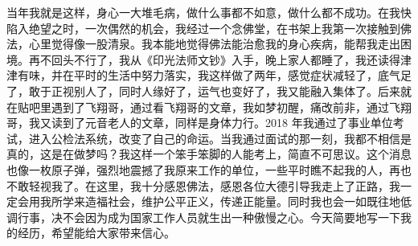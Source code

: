\begin{case}
    当年我就是这样，身心一大堆毛病，做什么事都不如意，做什么都不成功。在我快陷入绝望之时，一次偶然的机会，我经过一个念佛堂，在书架上我第一次接触到佛法，心里觉得像一股清泉。我本能地觉得佛法能治愈我的身心疾病，能帮我走出困境。再不回头不行了，我从《印光法师文钞》入手，晚上家人都睡了，我还读得津津有味，并在平时的生活中努力落实，我这样做了两年，感觉症状减轻了，底气足了，敢于正视别人了，同时人缘好了，运气也变好了，我又能融入集体了。后来就在贴吧里遇到了飞翔哥，通过看飞翔哥的文章，我如梦初醒，痛改前非，通过飞翔哥，我又读到了元音老人的文章，同样是身体力行。2018 年我通过了事业单位考试，进入公检法系统，改变了自己的命运。当我通过面试的那一刻，我都不相信是真的，这是在做梦吗？我这样一个笨手笨脚的人能考上，简直不可思议。这个消息也像一枚原子弹，强烈地震撼了我原来工作的单位，一些平时瞧不起我的人，再也不敢轻视我了。在这里，我十分感恩佛法，感恩各位大德引导我走上了正路，我一定会用我所学来造福社会，维护公平正义，传递正能量。同时我也会一如既往地低调行事，决不会因为成为国家工作人员就生出一种傲慢之心。今天简要地写一下我的经历，希望能给大家带来信心。


\end{case}
